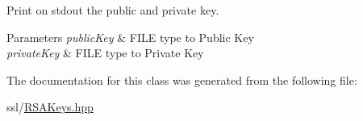 Print on stdout the public and private key. 


\begin{DoxyParams}{Parameters}
{\em public\+Key} & F\+I\+LE type to Public Key \\
\hline
{\em private\+Key} & F\+I\+LE type to Private Key \\
\hline
\end{DoxyParams}


The documentation for this class was generated from the following file\+:\begin{DoxyCompactItemize}
\item 
ssl/\hyperlink{_r_s_a_keys_8hpp}{R\+S\+A\+Keys.\+hpp}\end{DoxyCompactItemize}
